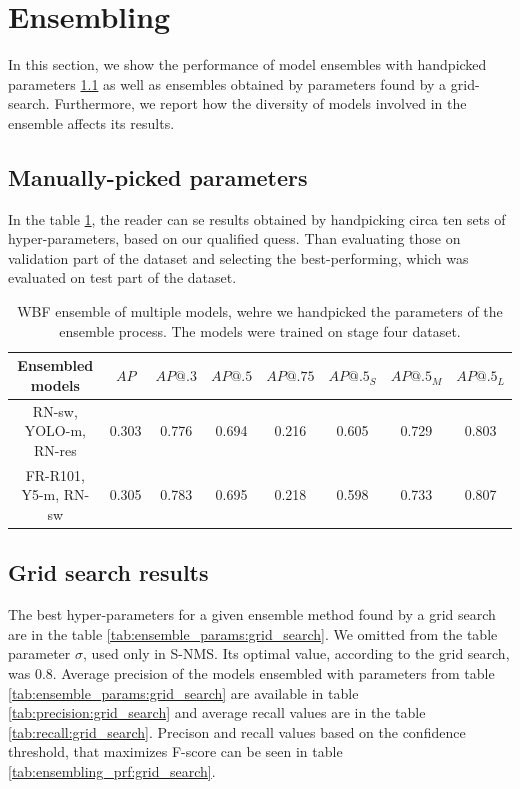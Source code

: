 \section{Ensembling}
\label{sec:ensembling_results}
In this section, we show the performance of model ensembles with handpicked parameters \ref{subsec:handpicked} as well as ensembles obtained by parameters found by a grid-search. Furthermore, we report how the diversity of models involved in the ensemble affects its results.
\subsection{Manually-picked parameters}
\label{subsec:handpicked}
In the table \ref{tab:model_ensembling:handpicked}, the reader can se results obtained by handpicking circa ten sets of hyper-parameters, based on our qualified quess. Than evaluating those on validation part of the dataset and selecting the best-performing, which was evaluated on test part of the dataset.
\begin{table}[H]
    \begin{tabular}{|c|c|c|c|c|c|c|c|}
        \hline
        Ensembled models      & $AP$  & $AP@.3$ & $AP@.5$ & $AP@.75$ & $AP@.5_S$ & $AP@.5_M$ & $AP@.5_L$ \\ \hline
        RN-sw, YOLO-m, RN-res & 0.303 & 0.776   & 0.694   & 0.216    & 0.605     & 0.729     & 0.803     \\ \hline
        FR-R101, Y5-m, RN-sw  & 0.305 & 0.783   & 0.695   & 0.218    & 0.598     & 0.733     & 0.807     \\ \hline
    \end{tabular}
    \caption{WBF ensemble of multiple models, wehre we handpicked the parameters of the ensemble process. The models were trained on stage four dataset.}
    \label{tab:model_ensembling:handpicked}
\end{table}
\subsection{Grid search results}
\label{subsec:gridsearched}
The best hyper-parameters for a given ensemble method found by a grid search are in the table \ref{tab:ensemble_params:grid_search}. We omitted from the table parameter $\sigma$, used only in S-NMS. Its optimal value, according to the grid search, was $0.8$.
Average precision of the models ensembled with parameters from table \ref{tab:ensemble_params:grid_search} are available in table \ref{tab:precision:grid_search} and average recall values are in the table \ref{tab:recall:grid_search}. Precison and recall values based on the confidence threshold, that maximizes F-score can be seen in table \ref{tab:ensembling_prf:grid_search}.

